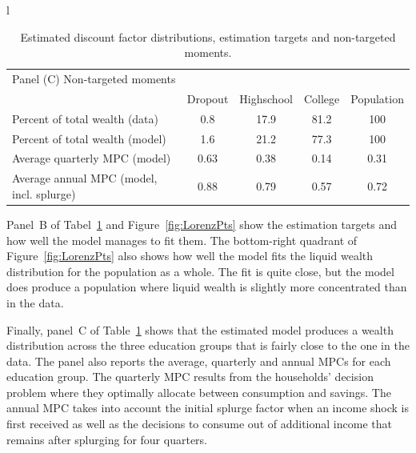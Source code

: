 \documentclass[../HAFiscal]{subfiles}
\begin{document}
\begin{table}[th]
\begin{center}
\begin{tabular}{l}
	\begin{tabular}{lcccc}
		\multicolumn{5}{l}{Panel (C) Non-targeted moments} \\ 
		& Dropout & Highschool & College & Population \\ \midrule
		Percent of total wealth (data) & 0.8 & 17.9 & 81.2 & 100 \\
		Percent of total wealth (model) & 1.6 & 21.2 & 77.3 & 100 \\
		Average quarterly MPC (model) & 0.63 & 0.38 & 0.14 & 0.31 \\
		Average annual MPC (model, incl. splurge) & 0.88 & 0.79 & 0.57 & 0.72
		\\ \bottomrule 
	\end{tabular}
\end{tabular}
\caption{Estimated discount factor distributions, estimation targets and non-targeted moments.}
\label{tab:estimBetas}
\end{center}
\end{table}

Panel~B of Tabel~\ref{tab:estimBetas} and Figure~\ref{fig:LorenzPts} show the estimation targets and how well the model manages to fit them. The bottom-right quadrant of Figure~\ref{fig:LorenzPts} also shows how well the model fits the liquid wealth distribution for the population as a whole. The fit is quite close, but the model does produce a population where liquid wealth is slightly more concentrated than in the data. 

Finally, panel~C of Table~\ref{tab:estimBetas} shows that the estimated model produces a wealth distribution across the three education groups that is fairly close to the one in the data. The panel also reports the average, quarterly and annual MPCs for each education group. The quarterly MPC results from the households' decision problem where they optimally allocate between consumption and savings. The annual MPC takes into account the initial splurge factor when an income shock is first received as well as the decisions to consume  out of additional income that remains after splurging for four quarters. 
\end{document}

